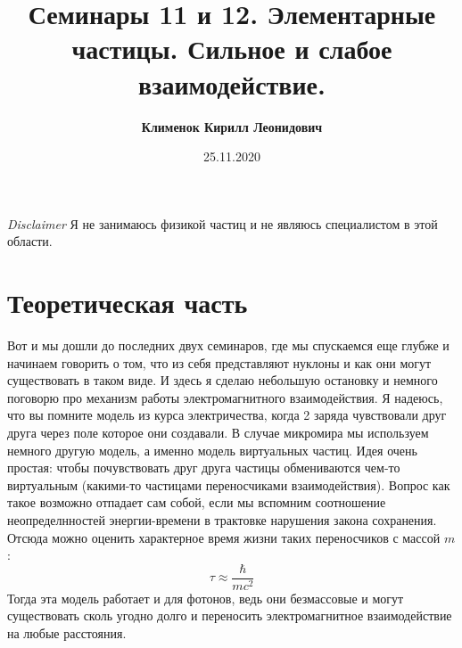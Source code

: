 \documentclass[12pt]{article}
\begin{document}
 
\title{\textbf{Семинары 11 и 12. Элементарные частицы. Сильное и слабое взаимодействие.}}
\author{\textbf{Клименок Кирилл Леонидович}}
\date{25.11.2020}
\maketitle
\textit{Disclaimer} Я не занимаюсь физикой частиц и не являюсь специалистом в этой области.
\section{Теоретическая часть}
Вот и мы дошли до последних двух семинаров, где мы спускаемся еще глубже и начинаем говорить о том, что из себя представляют нуклоны и как они могут существовать в таком виде. И здесь я сделаю небольшую остановку и немного поговорю про механизм работы электромагнитного взаимодействия. Я надеюсь, что вы помните модель из курса электричества, когда 2 заряда чувствовали друг друга через поле которое они создавали. В случае микромира мы используем немного другую модель, а именно модель виртуальных частиц. Идея очень простая: чтобы почувствовать друг друга частицы обмениваются чем-то виртуальным (какими-то частицами переносчиками взаимодействия). Вопрос как такое возможно отпадает сам собой, если мы вспомним соотношение неопределнностей энергии-времени в трактовке нарушения закона сохранения. Отсюда можно оценить характерное время жизни таких переносчиков с массой $m$:
\begin{equation*}
    \tau \approx \dfrac{\hbar}{mc^2}
\end{equation*}
Тогда эта модель работает и для фотонов, ведь они безмассовые и могут существовать сколь угодно долго и переносить электромагнитное взаимодействие на любые расстояния.
\end{document}
